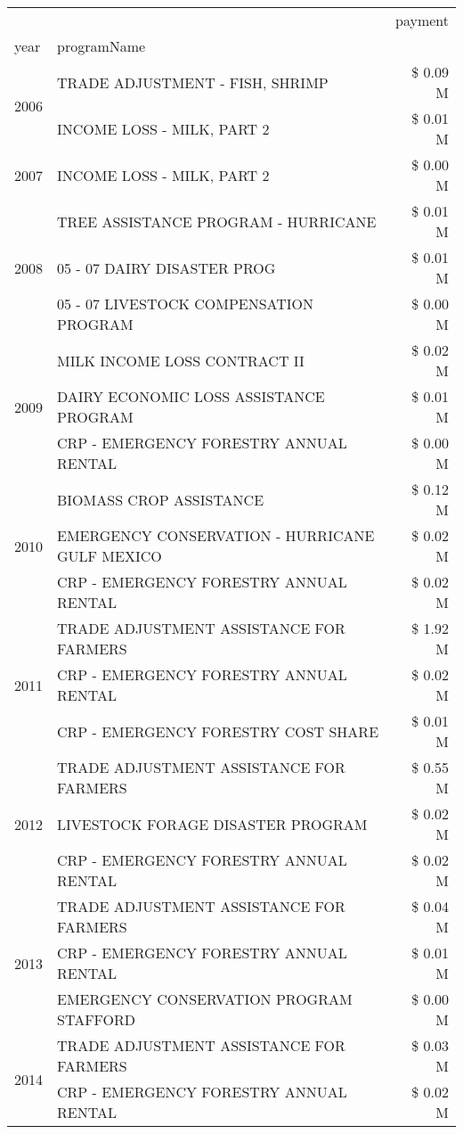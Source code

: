 \begin{tabular}{llr}
\toprule
 &  & payment \\
year & programName &  \\
\midrule
\multirow[t]{2}{*}{2006} & TRADE ADJUSTMENT - FISH, SHRIMP & \$ 0.09 M \\
 & INCOME LOSS - MILK, PART 2 & \$ 0.01 M \\
\cline{1-3}
2007 & INCOME LOSS - MILK, PART 2 & \$ 0.00 M \\
\cline{1-3}
\multirow[t]{3}{*}{2008} & TREE ASSISTANCE PROGRAM - HURRICANE & \$ 0.01 M \\
 & 05 - 07 DAIRY DISASTER PROG & \$ 0.01 M \\
 & 05 - 07 LIVESTOCK COMPENSATION PROGRAM & \$ 0.00 M \\
\cline{1-3}
\multirow[t]{3}{*}{2009} & MILK INCOME LOSS CONTRACT II & \$ 0.02 M \\
 & DAIRY ECONOMIC LOSS ASSISTANCE PROGRAM & \$ 0.01 M \\
 & CRP - EMERGENCY FORESTRY ANNUAL RENTAL & \$ 0.00 M \\
\cline{1-3}
\multirow[t]{3}{*}{2010} & BIOMASS CROP ASSISTANCE & \$ 0.12 M \\
 & EMERGENCY CONSERVATION - HURRICANE GULF MEXICO & \$ 0.02 M \\
 & CRP - EMERGENCY FORESTRY ANNUAL RENTAL & \$ 0.02 M \\
\cline{1-3}
\multirow[t]{3}{*}{2011} & TRADE ADJUSTMENT ASSISTANCE FOR FARMERS & \$ 1.92 M \\
 & CRP - EMERGENCY FORESTRY ANNUAL RENTAL & \$ 0.02 M \\
 & CRP - EMERGENCY FORESTRY COST SHARE & \$ 0.01 M \\
\cline{1-3}
\multirow[t]{3}{*}{2012} & TRADE ADJUSTMENT ASSISTANCE FOR FARMERS & \$ 0.55 M \\
 & LIVESTOCK FORAGE DISASTER PROGRAM & \$ 0.02 M \\
 & CRP - EMERGENCY FORESTRY ANNUAL RENTAL & \$ 0.02 M \\
\cline{1-3}
\multirow[t]{3}{*}{2013} & TRADE ADJUSTMENT ASSISTANCE FOR FARMERS & \$ 0.04 M \\
 & CRP - EMERGENCY FORESTRY ANNUAL RENTAL & \$ 0.01 M \\
 & EMERGENCY CONSERVATION PROGRAM STAFFORD & \$ 0.00 M \\
\cline{1-3}
\multirow[t]{3}{*}{2014} & TRADE ADJUSTMENT ASSISTANCE FOR FARMERS & \$ 0.03 M \\
 & CRP - EMERGENCY FORESTRY ANNUAL RENTAL & \$ 0.02 M \\

\end{tabular}
